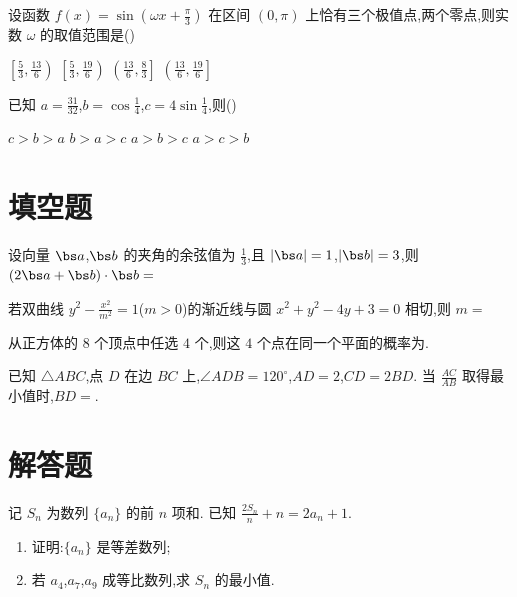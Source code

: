 \begin{problem}
设函数 \(f(x)=\sin\left(\omega x+\frac\pi3\right)\) 在区间 \((0,\pi)\) 上恰有三个极值点,两个零点,则实数 \(\omega\) 的取值范围是(\quad)

\choices
    {\(\left[\frac53,\frac{13}6\right)\)}
    {\(\left[\frac53,\frac{19}6\right)\)}
    {\(\left(\frac{13}6,\frac83\right]\)}
    {\(\left(\frac{13}6,\frac{19}6\right]\)}
\end{problem}

\begin{problem}
已知 \(a=\frac{31}{32}\),\(b=\cos\frac14\),\(c=4\sin\frac14\),则(\quad)

\choices
    {\(c>b>a\)}
    {\(b>a>c\)}
    {\(a>b>c\)}
    {\(a>c>b\)}
\end{problem}

\section{填空题}

\begin{problem}
设向量 \(\bs a\),\(\bs b\) 的夹角的余弦值为 \(\frac13\),且 \(|\bs a|=1\),\(|\bs b|=3\),则 \((2\bs a+\bs b)\cdot\bs b=\)\fillinblank{}
\end{problem}

\begin{problem}
若双曲线 \(y^2-\frac{x^2}{m^2}=1\)(\(m>0\))的渐近线与圆 \(x^2+y^2-4y+3=0\) 相切,则 \(m=\)\fillinblank{}
\end{problem}

\begin{problem}
从正方体的 \(8\) 个顶点中任选 \(4\) 个,则这 \(4\) 个点在同一个平面的概率为\fillinblank{}.
\end{problem}

\begin{problem}
已知 \(\triangle ABC\),点 \(D\) 在边 \(BC\) 上,\(\angle ADB=120^\circ\),\(AD=2\),\(CD=2BD\). 当 \(\frac{AC}{AB}\) 取得最小值时,\(BD=\)\fillinblank{}.
\end{problem}

\section{解答题}

\begin{problem}
记 \(S_n\) 为数列 \(\{a_n\}\) 的前 \(n\) 项和. 已知 \(\frac{2S_n}{n}+n=2a_n+1\).

\begin{enumerate}
\item 证明:\(\{a_n\}\) 是等差数列;
\item 若 \(a_4\),\(a_7\),\(a_9\) 成等比数列,求 \(S_n\) 的最小值.
\end{enumerate}
\end{problem}

